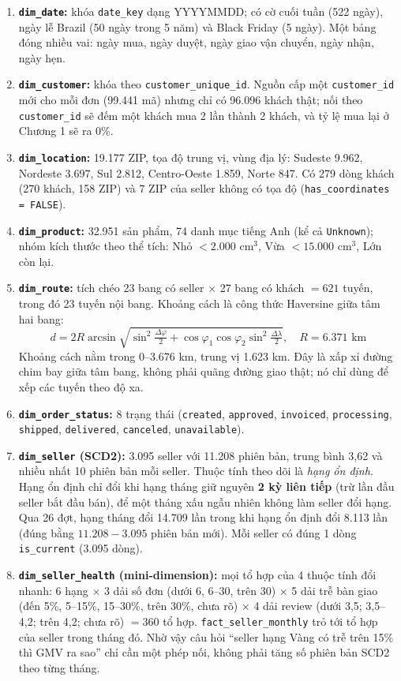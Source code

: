 \begin{enumerate}
    \item \textbf{\texttt{dim\_date}:} khóa \texttt{date\_key} dạng YYYYMMDD; có cờ cuối tuần (522 ngày), ngày lễ Brazil (50 ngày trong 5 năm) và Black Friday (5 ngày). Một bảng đóng nhiều vai: ngày mua, ngày duyệt, ngày giao vận chuyển, ngày nhận, ngày hẹn.
    \item \textbf{\texttt{dim\_customer}:} khóa theo \texttt{customer\_unique\_id}. Nguồn cấp một \texttt{customer\_id} mới cho mỗi đơn (99.441 mã) nhưng chỉ có 96.096 khách thật; nối theo \texttt{customer\_id} sẽ đếm một khách mua 2 lần thành 2 khách, và tỷ lệ mua lại ở Chương 1 sẽ ra 0\%.
    \item \textbf{\texttt{dim\_location}:} 19.177 ZIP, tọa độ trung vị, vùng địa lý: Sudeste 9.962, Nordeste 3.697, Sul 2.812, Centro-Oeste 1.859, Norte 847. Có 279 dòng khách (270 khách, 158 ZIP) và 7 ZIP của seller không có tọa độ (\texttt{has\_coordinates = FALSE}).
    \item \textbf{\texttt{dim\_product}:} 32.951 sản phẩm, 74 danh mục tiếng Anh (kể cả \texttt{Unknown}); nhóm kích thước theo thể tích: Nhỏ $< 2.000$ cm$^3$, Vừa $< 15.000$ cm$^3$, Lớn còn lại.
    \item \textbf{\texttt{dim\_route}:} tích chéo 23 bang có seller $\times$ 27 bang có khách $= 621$ tuyến, trong đó 23 tuyến nội bang. Khoảng cách là công thức Haversine giữa tâm hai bang:
    \begin{equation}
    d = 2R \arcsin\sqrt{\sin^2\!\tfrac{\Delta\varphi}{2} + \cos\varphi_1 \cos\varphi_2 \sin^2\!\tfrac{\Delta\lambda}{2}}, \quad R = 6.371 \text{ km}
    \end{equation}
    Khoảng cách nằm trong 0--3.676 km, trung vị 1.623 km. Đây là xấp xỉ đường chim bay giữa tâm bang, không phải quãng đường giao thật; nó chỉ dùng để xếp các tuyến theo độ xa.
    \item \textbf{\texttt{dim\_order\_status}:} 8 trạng thái (\texttt{created}, \texttt{approved}, \texttt{invoiced}, \texttt{processing}, \texttt{shipped}, \texttt{delivered}, \texttt{canceled}, \texttt{unavailable}).
    \item \textbf{\texttt{dim\_seller} (SCD2):} 3.095 seller với 11.208 phiên bản, trung bình 3,62 và nhiều nhất 10 phiên bản mỗi seller. Thuộc tính theo dõi là \emph{hạng ổn định}. Hạng ổn định chỉ đổi khi hạng tháng giữ nguyên \textbf{2 kỳ liên tiếp} (trừ lần đầu seller bắt đầu bán), để một tháng xấu ngẫu nhiên không làm seller đổi hạng. Qua 26 đợt, hạng tháng đổi 14.709 lần trong khi hạng ổn định đổi 8.113 lần (đúng bằng $11.208 - 3.095$ phiên bản mới). Mỗi seller có đúng 1 dòng \texttt{is\_current} (3.095 dòng).
    \item \textbf{\texttt{dim\_seller\_health} (mini-dimension):} mọi tổ hợp của 4 thuộc tính đổi nhanh: 6 hạng $\times$ 3 dải số đơn (dưới 6, 6--30, trên 30) $\times$ 5 dải trễ bàn giao (đến 5\%, 5--15\%, 15--30\%, trên 30\%, chưa rõ) $\times$ 4 dải review (dưới 3,5; 3,5--4,2; trên 4,2; chưa rõ) $= 360$ tổ hợp. \texttt{fact\_seller\_monthly} trỏ tới tổ hợp của seller trong tháng đó. Nhờ vậy câu hỏi ``seller hạng Vàng có trễ trên 15\% thì GMV ra sao'' chỉ cần một phép nối, không phải tăng số phiên bản SCD2 theo từng tháng.
\end{enumerate}

